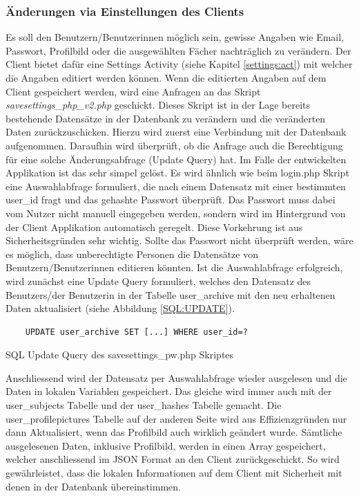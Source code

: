 \documentclass[a4paper,11pt]{report}
\newenvironment{code}{\captionsetup{type=figure}}{}
\begin{document}
					\subsubsection{Änderungen via Einstellungen des Clients}
					Es soll den Benutzern/Benutzerinnen möglich sein, gewisse Angaben wie Email, Passwort, Profilbild oder die ausgewählten Fächer nachträglich zu verändern. Der Client bietet dafür eine Settings Activity (siehe Kapitel \ref{settings:act}) mit welcher die Angaben editiert werden können. Wenn die editierten Angaben auf dem Client gespeichert werden, wird eine Anfragen an das Skript \emph{savesettings\_php\_v2.php} geschickt. Dieses Skript ist in der Lage bereits bestehende Datensätze in der Datenbank zu verändern und die veränderten Daten zurückzuschicken. Hierzu wird zuerst eine Verbindung mit der Datenbank aufgenommen. Daraufhin wird überprüft, ob die Anfrage auch die Berechtigung für eine solche Änderungsabfrage (Update Query) hat. Im Falle der entwickelten Applikation ist das sehr simpel gelöst. Es wird ähnlich wie beim login.php Skript eine Auswahlabfrage formuliert, die nach einem Datensatz mit einer bestimmten user\_id fragt und das gehashte Passwort überprüft. Das Passwort muss dabei vom Nutzer nicht manuell eingegeben werden, sondern wird im Hintergrund von der Client Applikation automatisch geregelt. Diese Vorkehrung ist aus Sicherheitsgründen sehr wichtig. Sollte das Passwort nicht überprüft werden, wäre es möglich, dass unberechtigte Personen die Datensätze von Benutzern/Benutzerinnen editieren könnten. Ist die Auswahlabfrage erfolgreich, wird zunächst eine Update Query formuliert, welches den Datensatz des Benutzers/der Benutzerin in der Tabelle user\_archive mit den neu erhaltenen Daten aktualisiert (siehe Abbildung \ref{SQL:UPDATE}).
				\begin{code} 
					\begin{center}
						\begin{verbatim}
	UPDATE user_archive SET [...] WHERE user_id=?
						\end{verbatim}
						\caption{SQL Update Query des savesettings\_pw.php Skriptes}\label{SQL:UPDATE}
					\end{center}
				\end{code}
					Anschliessend wird der Datensatz per Auswahlabfrage wieder ausgelesen und die Daten in lokalen Variablen gespeichert. Das gleiche wird immer auch mit der user\_subjects Tabelle und der user\_hashes Tabelle gemacht. Die user\_profilepictures Tabelle auf der anderen Seite wird aus Effizienzgründen nur dann Aktualisiert, wenn das Profilbild auch wirklich geändert wurde. Sämtliche ausgelesenen Daten, inklusive Profilbild, werden in einen Array gespeichert, welcher anschliessend im JSON Format an den Client zurückgeschickt. So wird gewährleistet, dass die lokalen Informationen auf dem Client mit Sicherheit mit denen in der Datenbank übereinstimmen.
					
\end{document}

